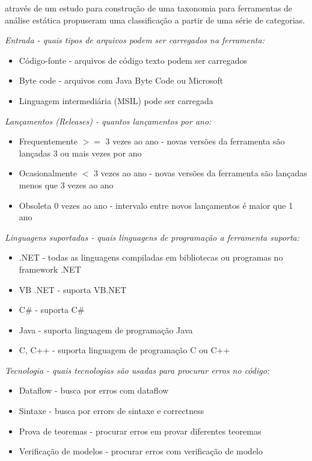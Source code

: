  através de um estudo para construção de uma taxonomia
para ferramentas de análise estática propuseram uma classificação a partir de
uma série de categorias.

\begin{description}

  \item {\it Entrada - quais tipos de arquivos podem ser carregados na ferramenta:}
    \begin{itemize}
      \item Código-fonte - arquivos de código texto podem ser carregados
      \item Byte code - arquivos com Java Byte Code ou Microsoft
      \item Linguagem intermediária (MSIL) pode ser carregada
    \end{itemize}

  \item {\it Lançamentos ({\it Releases}) - quantos lançamentos por ano:}
    \begin{itemize}
      \item Frequentemente $>=$ 3 vezes ao ano - novas versões da ferramenta são lançadas 3 ou mais vezes por ano
      \item Ocasionalmente $<$ 3 vezes ao ano - novas versões da ferramenta são lançadas menos que 3 vezes ao ano
      \item Obsoleta 0 vezes ao ano - intervalo entre novos lançamentos é maior que 1 ano
    \end{itemize}

  \item {\it Linguagens suportadas - quais linguagens de programação a ferramenta suporta:}
    \begin{itemize}
      \item .NET - todas as linguagens compiladas em bibliotecas ou programas no framework .NET
      \item VB .NET - suporta VB.NET
      \item C\# - suporta C\#
      \item Java - suporta linguagem de programação Java
      \item C, C++ - suporta linguagem de programação C ou C++
    \end{itemize}

  \item {\it Tecnologia - quais tecnologias são usadas para procurar erros no código:}
    \begin{itemize}
      \item Dataflow - busca por erros com dataflow
      \item Sintaxe - busca por errors de sintaxe e correctness
      \item Prova de teoremas - procurar erros em provar diferentes teoremas
      \item Verificação de modelos - procurar erros com verificação de modelo
    \end{itemize}


\end{description}
